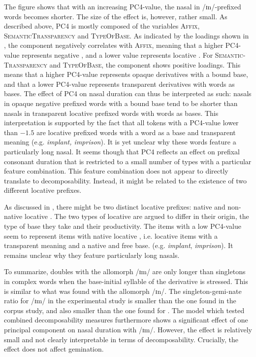 The figure shows that with an increasing \textsc{PC4}-value, the nasal in /ɪn/-prefixed words becomes shorter. The size of the effect is, however, rather small. 
As described above, \textsc{PC4} is mostly composed of the variables \textsc{Affix}, \textsc{SemanticTransparency} and \textsc{TypeOfBase}. As indicated by the loadings shown in , the component negatively correlates with \textsc{Affix}, meaning that a higher \textsc{PC4}-value represents negative , and a lower value represents locative . For \textsc{Semantic- Transparency} and \textsc{TypeOfBase}, the component shows positive loadings. This means that a higher \textsc{PC4}-value represents opaque derivatives with a bound base, and that a lower \textsc{PC4}-value represents transparent derivatives with words as bases.
The effect of \textsc{PC4} on nasal duration can thus be interpreted as such: nasals in opaque negative prefixed words with a bound base tend to be shorter than nasals in transparent locative prefixed words with words as bases. This interpretation is supported by the fact that all tokens with a \textsc{PC4}-value lower than $-1.5$ are locative prefixed words with a word as a base and transparent meaning (e.g. \textit{implant, imprison}). It is yet unclear why these words feature a particularly long nasal. 
It seems though that \textsc{PC4} reflects an effect on prefixal consonant duration that is restricted to a small number of types with a particular feature combination. This feature combination does not appear to directly translate to decomposability.  
Instead, it might be related to the existence of two different locative prefixes. 

As discussed in , there might be two distinct locative prefixes: native and non-native locative . The two types of locative  are argued to differ in their origin, the type of base they take and their productivity. The items with a low \textsc{PC4}-value seem to represent items with native locative , i.e. locative items with a transparent meaning and a native and free base. (e.g. \textit{implant}, \textit{imprison}). It remains unclear why they feature particularly long nasals.



To summarize,  doubles with the allomorph /ɪm/ are only longer than singletons in complex words when the base-initial syllable of the derivative is stressed. This is similar to what was found with the allomorph /ɪn/. The singleton-gemi-nate ratio for /ɪm/ in the experimental study is smaller than the one found in the corpus study, and also smaller than the one found for . 
The model which tested combined decomposability measures furthermore shows a significant effect of one principal component on nasal duration with /ɪm/. However, the effect is relatively small and not clearly interpretable in terms of decomposability. Crucially, the effect does not affect gemination.




